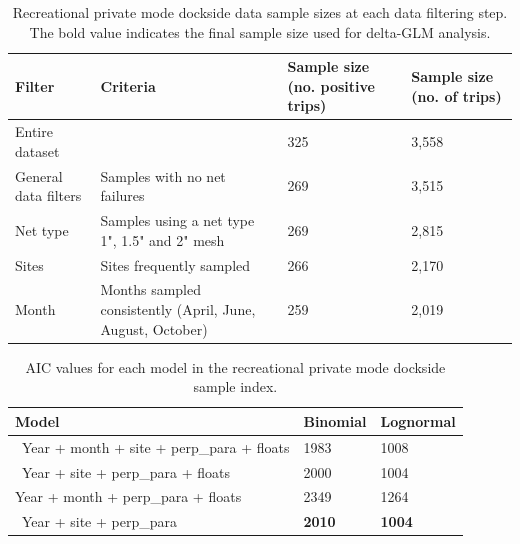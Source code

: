\documentclass[12pt,]{article}
\begin{document}
\begin{table}[ht]
\centering
\caption{Recreational private mode dockside data sample 
                                          sizes at each data filtering step.  
                                          The bold value indicates the final sample size 
                                          used for delta-GLM analysis.} 
\label{tab:Fleet9_GillnetSurvey_filter}
\begin{tabular}{>{\raggedright}p{1.5in}>{\raggedright}p{2.6in}>{\raggedright}p{1in}>{\raggedright}p{1in}}
  \hline
Filter & Criteria & Sample size (no. positive trips) & Sample size (no. of trips) \\ 
  \hline
Entire dataset &  & 325 & 3,558 \\ 
  General data filters & Samples with  no net failures & 269 & 3,515 \\ 
  Net type & Samples using a net type 1", 1.5" and 2" mesh & 269 & 2,815 \\ 
  Sites & Sites frequently sampled & 266 & 2,170 \\ 
  Month & Months sampled consistently (April, June, August, October) & 259 & 2,019 \\ 
   \hline
\end{tabular}
\end{table}\vspace{2in}

\begin{table}[ht]
\centering
\caption{AIC values for each model in the
                                          recreational private mode dockside sample 
                                          index.} 
\label{tab:Fleet9_GillnetSurvey_aic}
\begin{tabular}{lll}
  \hline
Model & Binomial & Lognormal \\ 
  \hline
~Year + month + site + perp\_para + floats & 1983 & 1008 \\ 
  ~Year + site + perp\_para  + floats & 2000 & 1004 \\ 
   Year + month  + perp\_para + floats & 2349 & 1264 \\ 
  ~Year  + site +  perp\_para & \textbf{2010} & \textbf{1004} \\ 
   \hline
\end{tabular}
\end{table}\vspace{2in}
\end{document}
